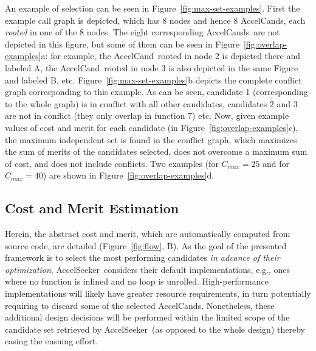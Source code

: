 \documentclass[]{usiinfthesis}
\newcommand{\aseeker}{{AccelSeeker}}
\newcommand{\candidate}{{AccelCand}}
\newcommand{\candidates}{{AccelCand}s}
\begin{document}
An example of selection can be seen in
Figure~\ref{fig:max-set-examples}. First the example call graph is
depicted, which has 8 nodes and hence 8 \candidates, each
\emph{rooted} in one of the 8 nodes. The eight corresponding
\candidates\ are not depicted in this figure, but some of them can be
seen in Figure~\ref{fig:overlap-examples}a: for example, the
\candidate\ rooted in node 2 is depicted there and labeled A, the
\candidate\ rooted in node 3 is also depicted in the same Figure and
labeled B, etc.  Figure~\ref{fig:max-set-examples}b depicts the
complete conflict graph corresponding to this example. As can be seen,
candidate 1 (corresponding to the whole graph) is in conflict with all
other candidates, candidates 2 and 3 are not in conflict (they only
overlap in function 7) etc. Now, given example values of cost and
merit for each candidate (in Figure~\ref{fig:overlap-examples}c), the
maximum independent set is found in the conflict graph, which
maximizes the sum of merits of the candidates selected, does not
overcome a maximum sum of cost, and does not include conflicts. Two
examples (for $C_{max} = 25$ and for $C_{max} = 40$) are shown in
Figure~\ref{fig:overlap-examples}d.




\subsection{Cost and Merit Estimation}
\label{sec:estimation}

Herein, the abstract cost and merit, which are automatically computed from 
source code, are detailed (Figure~\ref{fig:flow}, B). As the goal of the 
presented framework is to select the most performing candidates \emph{in 
advance of their optimization}, \aseeker\ considers their default implementations,
e.g., ones where no function is inlined and no loop is unrolled.
High-performance implementations will likely have greater resource
requirements, in turn potentially requiring to discard some of the
selected \candidates. Nonetheless, these additional design decisions will
be performed within the limited scope of the candidate set retrieved
by \aseeker\ (as opposed to the whole design) thereby easing the
ensuing effort.\par
\end{document}
